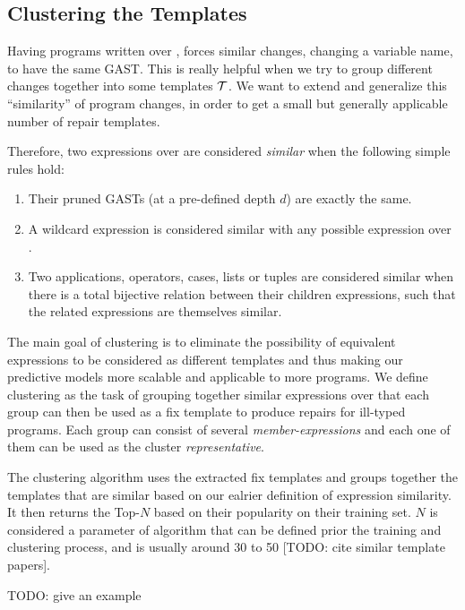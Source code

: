 \subsection{Clustering the Templates}
\label{subsec:clustering}

Having programs written over \repairLang, forces similar changes, \ie changing a
variable name, to have the same GAST. This is really helpful when we try to
group different changes together into some templates $\mathcal{T}$. We want to extend and
generalize this ``similarity'' of program changes, in order to get a small but
generally applicable number of repair templates.

Therefore, two expressions over \repairLang are considered \emph{similar} when
the following simple rules hold:
\begin{enumerate}
    \item Their pruned GASTs (at a pre-defined depth $d$) are exactly the same.
    \item A wildcard expression is considered similar with any possible
    expression over \repairLang.
    \item Two applications, operators, cases, lists or tuples are considered
    similar when there is a total bijective relation between their children
    expressions, such that the related expressions are themselves similar.
\end{enumerate}


The main goal of clustering is to eliminate the possibility of equivalent
expressions to be considered as different templates and thus making our
predictive models more scalable and applicable to more programs. We define
clustering as the task of grouping together similar expressions over \repairLang
that each group can then be used as a fix template to produce repairs for
ill-typed programs. Each group can consist of several \emph{member-expressions}
and each one of them can be used as the cluster \emph{representative}.

The clustering algorithm uses the extracted fix templates and groups together
the templates that are similar based on our ealrier definition of expression
similarity. It then returns the Top-$N$ based on their popularity on their
training set. $N$ is considered a parameter of algorithm that can be defined
prior the training and clustering process, and is usually around 30 to 50 [TODO:
cite similar template papers].

TODO: give an example
